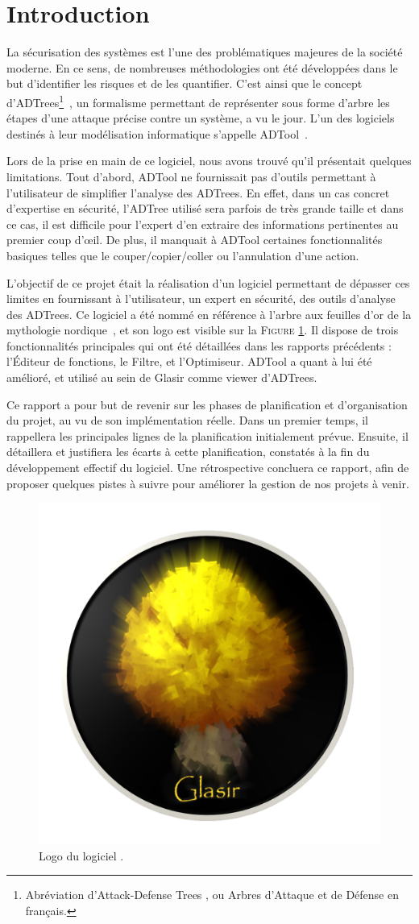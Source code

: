 \section{Introduction}
\label{sec:intro}

	La sécurisation des systèmes est l'une des problématiques majeures de la société moderne. En ce sens, de nombreuses méthodologies ont été développées dans le but d'identifier les risques et de les quantifier. C'est ainsi que le concept d'ADTrees\footnote{Abréviation d'\og Attack-Defense Trees \fg{}, ou \og Arbres d'Attaque et de Défense \fg{} en français.}~\cite{ADTrees}, un formalisme permettant de représenter sous forme d'arbre les étapes d'une attaque précise contre un système, a vu le jour. L'un des logiciels destinés à leur modélisation informatique s'appelle ADTool~\cite{ADToolPP}.

    Lors de la prise en main de ce logiciel, nous avons trouvé qu'il présentait quelques limitations. Tout d'abord, ADTool ne fournissait pas d'outils permettant à l'utilisateur de simplifier l'analyse des ADTrees. En effet, dans un cas concret d'expertise en sécurité, l'ADTree utilisé sera parfois de très grande taille et dans ce cas, il est difficile pour l'expert d'en extraire des informations pertinentes au premier coup d’œil. De plus, il manquait à ADTool certaines fonctionnalités \og basiques \fg{} telles que le couper/copier/coller ou l'annulation d'une action. 

    L'objectif de ce projet était la réalisation d'un logiciel permettant de dépasser ces limites en fournissant à l'utilisateur, un expert en sécurité, des outils d'analyse des ADTrees. Ce logiciel a été nommé \glasir{} en référence à l'arbre aux feuilles d'or de la mythologie nordique~\cite{vikingCulture}, et son logo est visible sur la \textsc{Figure} \ref{fig:glasir}. Il dispose de trois fonctionnalités principales qui ont été détaillées dans les rapports précédents : l'Éditeur de fonctions, le Filtre, et l'Optimiseur. ADTool a quant à lui été amélioré, et utilisé au sein de Glasir comme viewer d'ADTrees.

    Ce rapport a pour but de revenir sur les phases de planification et d'organisation du projet, au vu de son implémentation réelle. Dans un premier temps, il rappellera les principales lignes de la planification initialement prévue. Ensuite, il détaillera et justifiera les écarts à cette planification, constatés à la fin du développement effectif du logiciel. Une rétrospective concluera ce rapport, afin de proposer quelques pistes à suivre pour améliorer la gestion de nos projets à venir.

    \begin{figure}[H]
        \centering
        \includegraphics[height=0.4\textwidth]{figure/glasir.png}
        \caption{Logo du logiciel \glasir{}.}
        \label{fig:glasir}
    \end{figure}